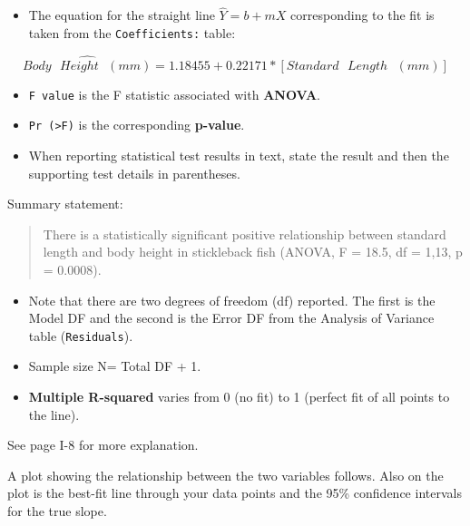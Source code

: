 \documentclass[twoside, 12pt]{article}
\newenvironment{Shaded}{\begin{snugshade}}{\end{snugshade}}
\newcommand{\KeywordTok}[1]{\textcolor[rgb]{0.13,0.29,0.53}{\textbf{{#1}}}}
\newcommand{\DataTypeTok}[1]{\textcolor[rgb]{0.13,0.29,0.53}{{#1}}}
\newcommand{\StringTok}[1]{\textcolor[rgb]{0.31,0.60,0.02}{{#1}}}
\newcommand{\OtherTok}[1]{\textcolor[rgb]{0.56,0.35,0.01}{{#1}}}
\newcommand{\NormalTok}[1]{{#1}}
\providecommand{\tightlist}{%
  \setlength{\itemsep}{0pt}\setlength{\parskip}{0pt}}
\begin{document}
\begin{itemize}
\tightlist
\item
  The equation for the straight line \(\hat{Y} = b + mX\) corresponding
  to the fit is taken from the \texttt{Coefficients:} table:
\end{itemize}

\[ \hat{Body \text{ } Height \text{ } (mm)} = 1.18455 + 0.22171 * [Standard \text{ } Length \text{ } (mm)] \]

\begin{itemize}
\item
  \texttt{F\ value} is the F statistic associated with \textbf{ANOVA}.
\item
  \texttt{Pr\ (\textgreater{}F)} is the corresponding \textbf{p-value}.
\item
  When reporting statistical test results in text, state the result and
  then the supporting test details in parentheses.
\end{itemize}

Summary statement:

\begin{quote}
There is a statistically significant positive relationship between
standard length and body height in stickleback fish (ANOVA, F = 18.5, df
= 1,13, p = 0.0008).
\end{quote}

\begin{itemize}
\item
  Note that there are two degrees of freedom (df) reported. The first is
  the Model DF and the second is the Error DF from the Analysis of
  Variance table (\texttt{Residuals}).
\item
  Sample size N= Total DF + 1.
\item
  \textbf{Multiple R-squared} varies from 0 (no fit) to 1 (perfect fit
  of all points to the line).
\end{itemize}

See page I-8 for more explanation.

A plot showing the relationship between the two variables follows. Also
on the plot is the best-fit line through your data points and the 95\%
confidence intervals for the true slope.

\begin{Shaded}
\end{Shaded}
\end{document}
